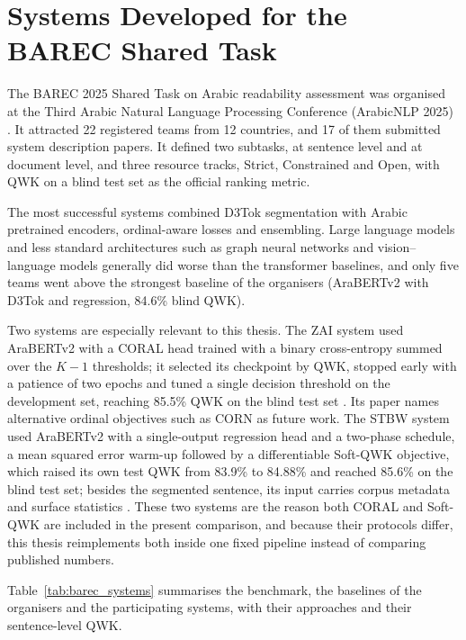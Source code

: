 \section{Systems Developed for the BAREC Shared Task}
\label{sec:lit-systems}

The BAREC 2025 Shared Task on Arabic readability assessment was organised at the Third Arabic
Natural Language Processing Conference (ArabicNLP 2025) \cite{elmadani2025sharedtask}. It
attracted 22 registered teams from 12 countries, and 17 of them submitted system description
papers. It defined two subtasks, at sentence level and at document level, and three resource
tracks, Strict, Constrained and Open, with QWK on a blind test set as the official ranking
metric.

The most successful systems combined D3Tok segmentation with Arabic pretrained encoders,
ordinal-aware losses and ensembling. Large language models and less standard architectures such
as graph neural networks and vision--language models generally did worse than the transformer
baselines, and only five teams went above the strongest baseline of the organisers (AraBERTv2 with
D3Tok and regression, 84.6\% blind QWK).

Two systems are especially relevant to this thesis. The ZAI system used AraBERTv2 with a CORAL
head trained with a binary cross-entropy summed over the $K{-}1$ thresholds; it selected its
checkpoint by QWK, stopped early with a patience of two epochs and tuned a single decision
threshold on the development set, reaching 85.5\% QWK on the blind test set \cite{nazzal2025zai}.
Its paper names alternative ordinal objectives such as CORN as future work. The STBW system used
AraBERTv2 with a single-output regression head and a two-phase schedule, a mean squared error
warm-up followed by a differentiable Soft-QWK objective, which raised its own test QWK from 83.9\%
to 84.88\% and reached 85.6\% on the blind test set; besides the segmented sentence, its input
carries corpus metadata and surface statistics \cite{trigui2025stbw}. These two systems are the
reason both CORAL and Soft-QWK are included in the present comparison, and because their
protocols differ, this thesis reimplements both inside one fixed pipeline instead of comparing
published numbers.

Table~\ref{tab:barec_systems} summarises the benchmark, the baselines of the organisers and the
participating systems, with their approaches and their sentence-level QWK.

